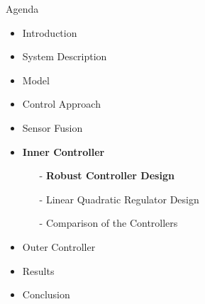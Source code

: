 
\begin{frame}{Agenda}{}
    \begin{itemize}
        \item Introduction
        \item System Description
        \item Model
        \item Control Approach
        \item Sensor Fusion
        \item \textcolor{aaublue}{\textbf{Inner Controller}}
        \begin{itemize}
            \item[-] \textcolor{aaublue}{\textbf{Robust Controller Design}}
            \item[-] Linear Quadratic Regulator Design
            \item[-] Comparison of the Controllers
        \end{itemize}
        \item Outer Controller
        \item Results
        \item Conclusion
    \end{itemize}
\end{frame}